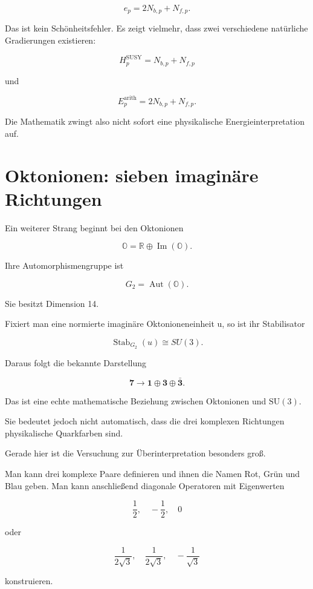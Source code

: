 \documentclass[11pt,a4paper]{article}
\begin{document}
\[
e_p=2N_{b,p}+N_{f,p}.
\]


Das ist kein Schönheitsfehler. Es zeigt vielmehr, dass zwei verschiedene natürliche Gradierungen existieren:


\[
H_p^{\mathrm{SUSY}}
=
N_{b,p}+N_{f,p}
\]


und


\[
E_p^{\mathrm{arith}}
=
2N_{b,p}+N_{f,p}.
\]


Die Mathematik zwingt also nicht sofort eine physikalische Energieinterpretation auf.





\section{Oktonionen: sieben imaginäre Richtungen}


Ein weiterer Strang beginnt bei den Oktonionen


\[
\mathbb O
=
\mathbb R
\oplus
\operatorname{Im}(\mathbb O).
\]


Ihre Automorphismengruppe ist


\[
G_2=\operatorname{Aut}(\mathbb O).
\]


Sie besitzt Dimension 14.


Fixiert man eine normierte imaginäre Oktonioneneinheit u, so ist ihr Stabilisator


\[
\operatorname{Stab}_{G_2}(u)\cong SU(3).
\]


Daraus folgt die bekannte Darstellung


\[
\mathbf7
\longrightarrow
\mathbf1\oplus\mathbf3\oplus\bar{\mathbf3}.
\]


Das ist eine echte mathematische Beziehung zwischen Oktonionen und \(\mathrm{SU}(3)\).


Sie bedeutet jedoch nicht automatisch, dass die drei komplexen Richtungen physikalische Quarkfarben sind.


Gerade hier ist die Versuchung zur Überinterpretation besonders groß.


Man kann drei komplexe Paare definieren und ihnen die Namen Rot, Grün und Blau geben. Man kann anschließend diagonale Operatoren mit Eigenwerten


\[
\frac12,\quad-\frac12,\quad0
\]


oder


\[
\frac{1}{2\sqrt{3}},
\quad
\frac{1}{2\sqrt{3}},
\quad
-\frac{1}{\sqrt{3}}
\]


konstruieren.
\end{document}
